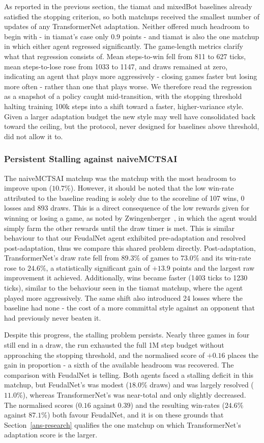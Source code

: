 \documentclass[sigconf,review=false]{acmart}
\begin{document}
As reported in the previous section, the tiamat and mixedBot baselines already satisfied the stopping criterion, so both matchups received the smallest number of updates of any TransformerNet adaptation. 
Neither offered much headroom to begin with - in tiamat's case only $0.9$ points - and tiamat is also the one matchup in which either agent regressed significantly. The game-length metrics clarify what that regression consists of.
Mean steps-to-win fell from 811 to 627 ticks, mean steps-to-lose rose from 1033 to 1147, and draws remained at zero, indicating an agent that plays more aggressively - closing games faster but losing more often - rather than one that plays worse. 
We therefore read the regression as a snapshot of a policy caught mid-transition, with the stopping threshold halting training 100k steps into a shift toward a faster, higher-variance style. 
Given a larger adaptation budget the new style may well have consolidated back toward the ceiling, but the protocol, never designed for baselines above threshold, did not allow it to.

\subsubsection{Persistent Stalling against naiveMCTSAI}
\label{stalling}
The naiveMCTSAI matchup was the matchup with the most headroom to improve upon ($10.7\%$). 
However, it should be noted that the low win-rate attributed to the baseline reading is solely due to the scoreline of 107 wins, 0 losses and 893 draws. This is a direct consequence of the low rewards given for winning or losing a game, as noted by Zwingenberger~\cite{transformernet}, in which the agent would simply farm the other rewards until the draw timer is met.
This is similar behaviour to that our FeudalNet agent exhibited pre-adaptation and resolved post-adaptation, thus we compare this shared problem directly. Post-adaptation, TransformerNet's draw rate fell from $89.3\%$ of games to $73.0\%$ and its win-rate rose to $24.6\%$, a statistically significant gain of $+13.9$ points and the largest raw improvement it achieved. 
Additionally, wins became faster (1403 ticks to 1230 ticks), similar to the behaviour seen in the tiamat matchup, where the agent played more aggressively.
The same shift also introduced 24 losses where the baseline had none - the cost of a more committal style against an opponent that had previously never beaten it.

Despite this progress, the stalling problem persists. 
Nearly three games in four still end in a draw, the run exhausted the full 1M step budget without approaching the stopping threshold, and the normalised score of $+0.16$ places the gain in proportion - a sixth of the available headroom was recovered. 
The comparison with FeudalNet is telling. Both agents faced a stalling deficit in this matchup, but FeudalNet's was modest ($18.0\%$ draws) and was largely resolved ($11.0\%$), whereas TransformerNet's was near-total and only slightly decreased. 
The normalised scores ($0.16$ against $0.39$) and the resulting win-rates ($24.6\%$ against $87.1\%$) both favour FeudalNet, and it is on these grounds that Section~\ref{ans-research} qualifies the one matchup on which TransformerNet's adaptation score is the larger.
\end{document}
